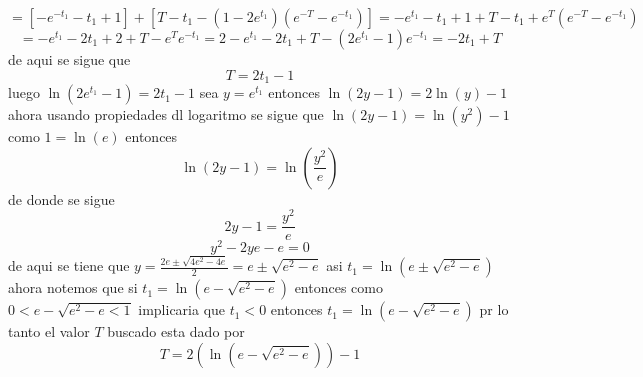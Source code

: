 \documentclass{ejercicios}
\begin{document}
\begin{solution}
    \[=[-e^{-t_1} - t_1 + 1] + [T-t_1 - (1 - 2e^{t_1})(e^{-T} - e^{-t_1})] = -e^{t_1} - t_1 + 1 + T - t_1 +e^T(e^{-T} - e^{-t_1})\]
    \[= -e^{t_1} - 2t_1 + 2 + T - e^Te^{-t_1} = 2 - e^{t_1} - 2t_1 + T - (2e^{t_1} - 1)e^{-t_1} = -2t_1 + T\]
    de aqui se sigue que 
    \[T = 2t_1 - 1\] 
    luego $\ln(2e^{t_1} - 1) = 2t_1 - 1$ sea $y = e^{t_1}$ entonces $\ln(2y - 1) = 2\ln(y) - 1$ ahora usando propiedades dl logaritmo se sigue
    que $\ln(2y - 1) = \ln(y^2) - 1$ como $1 = \ln(e)$ entonces 
    \[\ln(2y -1) = \ln\left(\frac{y^2}{e}\right)\]
    de donde se sigue 
    \[2y - 1 = \frac{y^2}{e}\]
    \[y^2 -2ye - e = 0\]
    de aqui se tiene que $y = \frac{2e\pm\sqrt{4e^2 - 4e}}{2} = e\pm\sqrt{e^2 - e}$ asi $t_1 = \ln(e\pm\sqrt{e^2 - e})$ ahora 
  notemos que si $t_1 = \ln(e - \sqrt{e^2 - e})$ entonces como $0<e-\sqrt{e^2 - e <1}$ implicaria que $t_1 < 0$
  entonces $t_1 = \ln(e - \sqrt{e^2 - e})$ pr lo tanto el valor $T$ buscado esta dado por 
  \[T = 2(\ln(e - \sqrt{e^2 - e})) - 1\]
  \end{solution}
\end{document}
